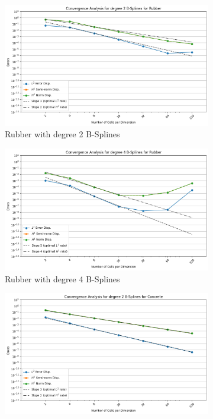 \documentclass[a4paper,12pt,twoside]{report}
\begin{document}
\begin{figure}[!h]
	\centering
	\begin{subfigure}[b]{0.49\textwidth}
		\centering
		\includegraphics[width=\textwidth]{figures/figures_non_mixed_realistic/convergence_plot_degree_2_lambda=160000000.0.png}
		\caption{Rubber with degree 2 B-Splines}
		\label{fig:rubber_degree_2}
	\end{subfigure}
	\begin{subfigure}[b]{0.49\textwidth}
		\centering
		\includegraphics[width=\textwidth]{figures/figures_non_mixed_realistic/convergence_plot_degree_4_lambda=160000000.0.png}
		\caption{Rubber with degree 4 B-Splines}
		\label{fig:rubber_degree_4}
	\end{subfigure}
	\centering
	\begin{subfigure}[b]{0.49\textwidth}
		\centering
		\includegraphics[width=\textwidth]{figures/figures_non_mixed_realistic/convergence_plot_degree_2_lambda=17000000000.0.png}

\end{subfigure}
\end{figure}
\end{document}
